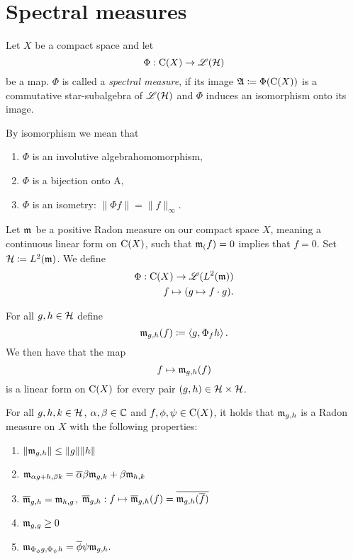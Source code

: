 
\section{Spectral measures}

\begin{defi}
 
 Let $X$ be a compact space and let
 \[
  \Phi : \operatorname{C} (X) \to \mathscr{L}(\mathcal{H})
 \]
be a map. $\Phi$ is called a \textit{spectral measure}, if its image 
$\mathfrak{A} \coloneqq \Phi(\operatorname{C} (X))$ is a commutative star-subalgebra of $\mathscr{L}(\mathcal{H})$ and 
$\Phi$ induces an isomorphism onto its image.
\end{defi}

\begin{rem}
 By isomorphism we mean that
 \begin{enumerate}
  \item $\Phi$ is an involutive algebrahomomorphism,
  \item $\Phi$ is a bijection onto A,
  \item $\Phi$ is an isometry: $\| \Phi f \| = \| f \|_\infty$.
 \end{enumerate}

\end{rem}


Let $\mathfrak{m}_{}$ be a positive Radon measure on our compact space $X$, meaning a
continuous linear form on $\operatorname{C} (X)$, such that $\mathfrak{m}_{(}f) = 0$ implies that $f=0$. Set $\mathcal{H} \coloneqq L^2(\mathfrak{m})$.
We define 
\begin{align*}
 \Phi : \operatorname{C}(X) \to \mathscr{L}({L^2(\mathfrak{m})}) \\
 f \mapsto (g \mapsto f\cdot g).
\end{align*}

For all $g , h \in \mathcal{H}$ define
\[
 \mathfrak{m}_{g, h} (f) \coloneqq \left\langle g, \Phi_f h \right\rangle.
\]
We then have that the map 
\[
 f \mapsto \mathfrak{m}_{g,h} (f)
\]
is a linear form on $\operatorname{C} (X)$ for every pair $(g, h) \in \mathcal{H} \times \mathcal{H}$.

\begin{thrm} \label{measureproperties}
For all $g, h,k \in \mathcal{H}$, $\alpha, \beta \in \mathbb{C}$ and $f, \phi, \psi \in 
\operatorname{C}(X)$, it holds that $\mathfrak{m}_{g,h}$ is a Radon measure on $X$ with the following 
properties:
\begin{enumerate}[{(}i{)}]
 \item $\| \mathfrak{m}_{g,h}\| \leq \|g\| \|h\|$
 \item $\mathfrak{m}_{\alpha g + h, \beta k} = \overline{\alpha}\beta \mathfrak{m}_{g,k} + 
 \beta \mathfrak{m}_{h,k}$
 \item $\overline{\mathfrak{m}}_{g,h} = \mathfrak{m}_{h,g}$, $\overline{\mathfrak{m}}_{g,h} : 
 f \mapsto \overline{\mathfrak{m}}_{g,h}(f) = \overline{\mathfrak{m}_{g,h}(\overline{f})}$
 \item $\mathfrak{m}_{g,g} \geq 0$
 \item $\mathfrak{m}_{\Phi_\phi g, \Phi_\psi h} = \overline{\phi} \psi \mathfrak{m}_{g,h}.$
\end{enumerate}

\end{thrm}

